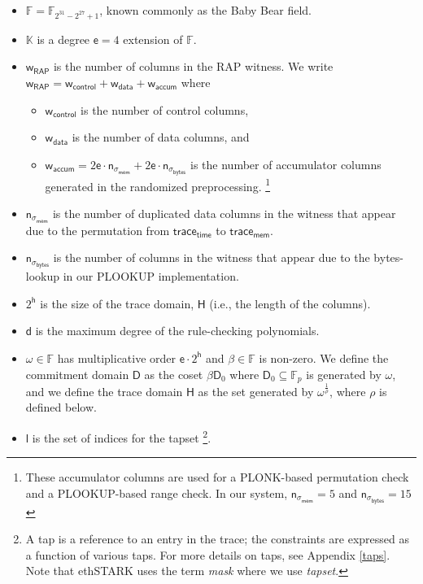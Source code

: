 \documentclass[10pt,letterpaper,titlepage]{article}
\newcommand{\GF}[1]{\mathbb{F}_{#1}}
\newcommand{\w}[0]{\omega}
\theoremstyle{definition}
\begin{document}
\begin{itemize}
  \item $\mathbb{F}=\mathbb{F}_{2^{31} - 2^{27} + 1}$, known commonly as the Baby Bear field.
  \item $\mathbb{K}$ is a degree $\mathsf{e}=4$ extension of $\mathbb{F}$.
  \item $\mathsf{w}_\mathsf{RAP}$ is the number of columns in the RAP witness.
  We write
  $\mathsf{w}_\mathsf{RAP} = \mathsf{w}_\mathsf{control} + \mathsf{w}_\mathsf{data} + \mathsf{w}_\mathsf{accum}$
  where
  \begin{itemize}
    \item $\mathsf{w}_\mathsf{control}$ is the number of control columns,
    \item $\mathsf{w}_\mathsf{data}$ is the number of data columns, and
    \item $\mathsf{w}_\mathsf{accum}=
    2\mathsf{e}\cdot\mathsf{n}_{\sigma_\mathsf{mem}}+2\mathsf{e}\cdot\mathsf{n}_{\sigma_\mathsf{bytes}}$
    is the number of accumulator columns generated in the randomized preprocessing.%
    \footnote{These accumulator columns are used for a PLONK-based permutation check and a PLOOKUP-based range check.
    In our system, $\mathsf{n}_{\sigma_\mathsf{mem}}=5$ and $\mathsf{n}_{\sigma_\mathsf{bytes}}=15$}
  \end{itemize}
  \item $\mathsf{n}_{\sigma_\mathsf{mem}}$ is the number of duplicated data columns in the witness that appear due to the permutation from $\mathsf{trace_{time}}$ to $\mathsf{trace_{mem}}$.
  \item $\mathsf{n}_{\sigma_\mathsf{bytes}}$ is the number of columns in the witness that appear due to the bytes-lookup in our PLOOKUP implementation.
  \item $2^\mathsf{h}$ is the size of the trace domain, $\mathsf{H}$ (i.e., the length of the columns).
  \item $\mathsf{d}$ is the maximum degree of the rule-checking polynomials.
  \item $\w\in\mathbb{F}$ has multiplicative order $\mathsf{e}\cdot2^\mathsf{h}$ and $\beta\in\mathbb{F}$ is non-zero.
  We define the commitment domain $\mathsf{D}$ as the coset $\beta \mathsf{D}_0$ where $\mathsf{D}_0\subseteq\GF{p}$ is generated by $\w$,
  and we define the trace domain $\mathsf{H}$ as the set generated by $\w^\frac{1}{\mathsf{\rho}}$, where $\rho$ is defined below.
  \item $\mathsf{l}$ is the set of indices for the tapset%
  \footnote{A tap is a reference to an entry in the trace; the constraints are expressed as a function of various taps. For more details on taps, see Appendix \ref{taps}. Note that ethSTARK uses the term \textit{mask} where we use \textit{tapset}.}.

\end{itemize}
\end{document}
